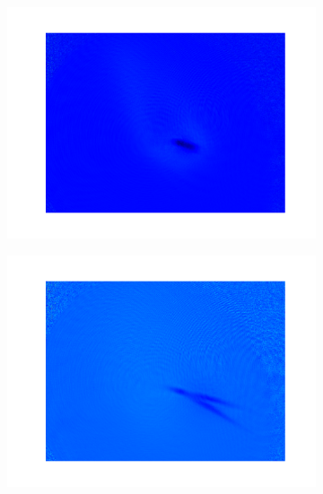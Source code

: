 \begin{figure}[h]
    \centering
    \begin{subfigure}[b]{0.3\textwidth}
        \includegraphics[width=1\textwidth]{figs/ODTimage1.pdf}
    \end{subfigure}\begin{subfigure}[b]{0.3\textwidth}
        \includegraphics[width=1\textwidth]{figs/ODTimage2.pdf}
    \end{subfigure}\begin{subfigure}[b]{0.3\textwidth}

\end{subfigure}
\end{figure}
